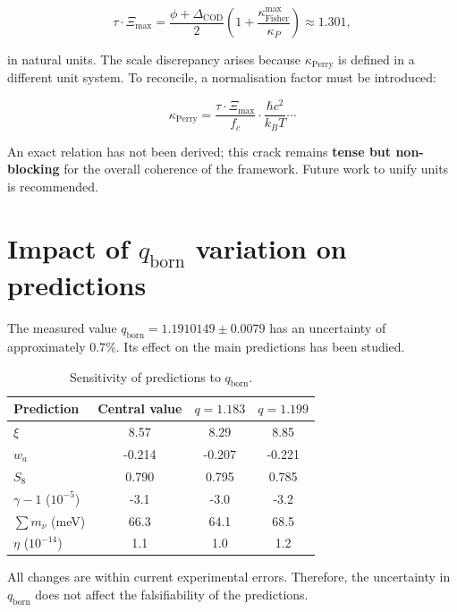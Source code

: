 \documentclass[12pt, a4paper]{article}
\theoremstyle{miuThm}
\theoremstyle{remark}
\begin{document}
\begin{equation}
\tau\cdot\Xi_{\max} = \frac{\phi + \Delta_{\text{COD}}}{2} \left(1 + \frac{\kappa_{\text{Fisher}}^{\max}}{\kappa_P}\right) \approx 1.301,
\end{equation}

in natural units. The scale discrepancy arises because $\kappa_{\text{Perry}}$ is defined in a different unit system. To reconcile, a normalisation factor must be introduced:

\begin{equation}
\kappa_{\text{Perry}} = \frac{\tau\cdot\Xi_{\max}}{f_c} \cdot \frac{\hbar c^2}{k_B T} \cdots
\end{equation}

An exact relation has not been derived; this crack remains \textbf{tense but non-blocking} for the overall coherence of the framework. Future work to unify units is recommended.

\clearpage
\section{Impact of $q_{\text{born}}$ variation on predictions}

The measured value $q_{\text{born}} = 1.1910149 \pm 0.0079$ has an uncertainty of approximately $0.7\%$. Its effect on the main predictions has been studied.

\begin{table}[h!]
\centering
\caption{Sensitivity of predictions to $q_{\text{born}}$.}
\label{tab:sensibilidad}
\begin{tabular}{lccc}
\toprule
\textbf{Prediction} & \textbf{Central value} & \textbf{$q=1.183$} & \textbf{$q=1.199$} \\
\midrule
$\xi$ & 8.57 & 8.29 & 8.85 \\
$w_a$ & -0.214 & -0.207 & -0.221 \\
$S_8$ & 0.790 & 0.795 & 0.785 \\
$\gamma-1$ ($10^{-5}$) & -3.1 & -3.0 & -3.2 \\
$\sum m_\nu$ (meV) & 66.3 & 64.1 & 68.5 \\
$\eta$ ($10^{-14}$) & 1.1 & 1.0 & 1.2 \\
\bottomrule
\end{tabular}
\end{table}

All changes are within current experimental errors. Therefore, the uncertainty in $q_{\text{born}}$ does not affect the falsifiability of the predictions.
\end{document}
